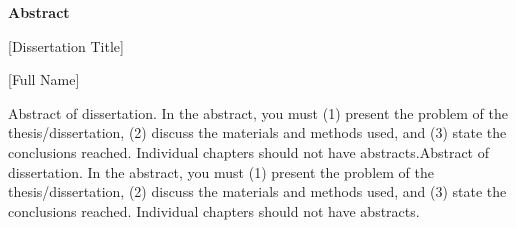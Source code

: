 \documentclass[12pt]{report}   %
\begin{document}

\begin{titlepage}
\begin{center}

\vspace*{5\baselineskip}
\textbf{\large Abstract}

[Dissertation Title]

[Full Name]
\end{center}
\begin{flushleft}
\hspace{10mm}Abstract of dissertation. In the abstract, you must (1) present the problem of the thesis/dissertation, (2) discuss the materials and methods used, and (3) state the conclusions reached. Individual chapters should not have abstracts.Abstract of dissertation. In the abstract, you must (1) present the problem of the thesis/dissertation, (2) discuss the materials and methods used, and (3) state the conclusions reached. Individual chapters should not have abstracts.

\end{flushleft}
\vspace*{\fill}
\end{titlepage}




\setcounter{page}{1} 
\renewcommand{\cftchapdotsep}{\cftdotsep}  %
\renewcommand{\cftchapfont}{\normalfont}  %
\renewcommand{\cftchappagefont}{}  %
\renewcommand{\cftchappresnum}{Chapter }
\renewcommand{\cftchapaftersnum}{:}
\renewcommand{\cftchapnumwidth}{5em}
\renewcommand{\cftchapafterpnum}{\vskip\baselineskip} %
\renewcommand{\cftsecafterpnum}{\vskip\baselineskip}  %
\renewcommand{\cftsubsecafterpnum}{\vskip\baselineskip} %
\renewcommand{\cftsubsubsecafterpnum}{\vskip\baselineskip} %

\end{document}
